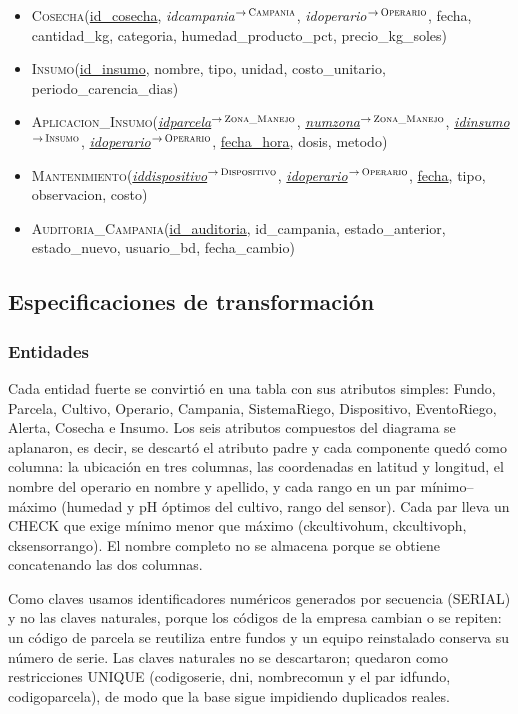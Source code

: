 \documentclass[11pt,letterpaper]{article}
\newcommand{\tbus}{\textunderscore\allowbreak}
\newcommand{\tb}[1]{{\ttfamily\let\_\tbus #1}}
\newcommand{\pk}[1]{\underline{#1}}
\newcommand{\fk}[2]{{\itshape\let\_\tbus #1}$^{\to\,\textsc{\let\_\tbus #2}}$}
\begin{document}
\begin{itemize}[leftmargin=1.2em,itemsep=0.3em]
\item \textsc{Cosecha}(\pk{id\_cosecha}, \fk{id\_campania}{Campania}, \fk{id\_operario}{Operario}, fecha, cantidad\_kg, categoria, humedad\_producto\_pct, precio\_kg\_soles)
\item \textsc{Insumo}(\pk{id\_insumo}, nombre, tipo, unidad, costo\_unitario, periodo\_carencia\_dias)
\item \textsc{Aplicacion\_Insumo}(\pk{\fk{id\_parcela}{Zona\_Manejo}}, \pk{\fk{num\_zona}{Zona\_Manejo}}, \pk{\fk{id\_insumo}{Insumo}}, \pk{\fk{id\_operario}{Operario}}, \pk{fecha\_hora}, dosis, metodo)
\item \textsc{Mantenimiento}(\pk{\fk{id\_dispositivo}{Dispositivo}}, \pk{\fk{id\_operario}{Operario}}, \pk{fecha}, tipo, observacion, costo)
\item \textsc{Auditoria\_Campania}(\pk{id\_auditoria}, id\_campania, estado\_anterior, estado\_nuevo, usuario\_bd, fecha\_cambio)
\end{itemize}

\subsection{Especificaciones de transformación}

\subsubsection{Entidades}\label{sec:trans-entidades}

Cada entidad fuerte se convirtió en una tabla con sus atributos simples: \tb{Fundo}, \tb{Parcela}, \tb{Cultivo}, \tb{Operario}, \tb{Campania}, \tb{Sistema\_Riego}, \tb{Dispositivo}, \tb{Evento\_Riego}, \tb{Alerta}, \tb{Cosecha} e \tb{Insumo}. Los seis atributos compuestos del diagrama se aplanaron, es decir, se descartó el atributo padre y cada componente quedó como columna: la ubicación en tres columnas, las coordenadas en \tb{latitud} y \tb{longitud}, el nombre del operario en \tb{nombre} y \tb{apellido}, y cada rango en un par mínimo--máximo (humedad y pH óptimos del cultivo, rango del sensor). Cada par lleva un \tb{CHECK} que exige mínimo menor que máximo (\tb{ck\_cultivo\_hum}, \tb{ck\_cultivo\_ph}, \tb{ck\_sensor\_rango}). El nombre completo no se almacena porque se obtiene concatenando las dos columnas.

Como claves usamos identificadores numéricos generados por secuencia (\tb{SERIAL}) y no las claves naturales, porque los códigos de la empresa cambian o se repiten: un código de parcela se reutiliza entre fundos y un equipo reinstalado conserva su número de serie. Las claves naturales no se descartaron; quedaron como restricciones \tb{UNIQUE} (\tb{codigo\_serie}, \tb{dni}, \tb{nombre\_comun} y el par \tb{id\_fundo}, \tb{codigo\_parcela}), de modo que la base sigue impidiendo duplicados reales.
\end{document}
